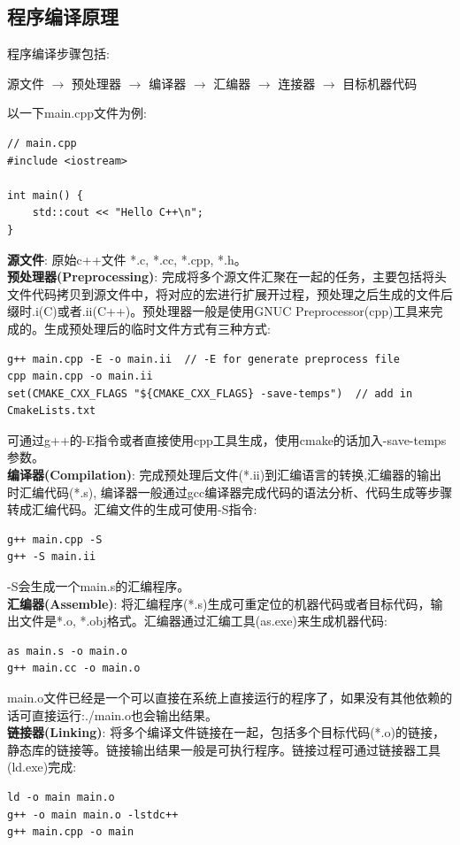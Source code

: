 \documentclass[12pt]{book}
\begin{document}
\subsection{程序编译原理}
程序编译步骤包括:
 \begin{center} 源文件 $\rightarrow$ 预处理器 $\rightarrow$ 编译器 $\rightarrow$ 汇编器 $\rightarrow$ 连接器 $\rightarrow$ 目标机器代码 \end{center}
以一下main.cpp文件为例:
\begin{lstlisting}
// main.cpp
#include <iostream>

int main() {
	std::cout << "Hello C++\n";
}
\end{lstlisting}
\textbf{源文件}: 原始c++文件 *.c, *.cc, *.cpp, *.h。\\
\textbf{预处理器(Preprocessing)}: 完成将多个源文件汇聚在一起的任务，主要包括将头文件代码拷贝到源文件中，将对应的宏进行扩展开过程，预处理之后生成的文件后缀时.i(C)或者.ii(C++)。预处理器一般是使用GNUC Preprocessor(cpp)工具来完成的。生成预处理后的临时文件方式有三种方式:
\begin{lstlisting}
g++ main.cpp -E -o main.ii  // -E for generate preprocess file
cpp main.cpp -o main.ii
set(CMAKE_CXX_FLAGS "${CMAKE_CXX_FLAGS} -save-temps")  // add in CmakeLists.txt
\end{lstlisting}
可通过g++的-E指令或者直接使用cpp工具生成，使用cmake的话加入-save-temps参数。\\
\textbf{编译器(Compilation)}: 完成预处理后文件(*.ii)到汇编语言的转换,汇编器的输出时汇编代码(*.s), 编译器一般通过gcc编译器完成代码的语法分析、代码生成等步骤转成汇编代码。汇编文件的生成可使用-S指令:
\begin{lstlisting}
g++ main.cpp -S
g++ -S main.ii
\end{lstlisting}
-S会生成一个main.s的汇编程序。\\
\textbf{汇编器(Assemble)}: 将汇编程序(*.s)生成可重定位的机器代码或者目标代码，输出文件是*.o, *.obj格式。汇编器通过汇编工具(as.exe)来生成机器代码:
\begin{lstlisting}
as main.s -o main.o
g++ main.cc -o main.o
\end{lstlisting}
main.o文件已经是一个可以直接在系统上直接运行的程序了，如果没有其他依赖的话可直接运行:./main.o也会输出结果。\\
\textbf{链接器(Linking)}: 将多个编译文件链接在一起，包括多个目标代码(*.o)的链接，静态库的链接等。链接输出结果一般是可执行程序。链接过程可通过链接器工具(ld.exe)完成:
\begin{lstlisting}
ld -o main main.o
g++ -o main main.o -lstdc++
g++ main.cpp -o main
\end{lstlisting}
\end{document}
